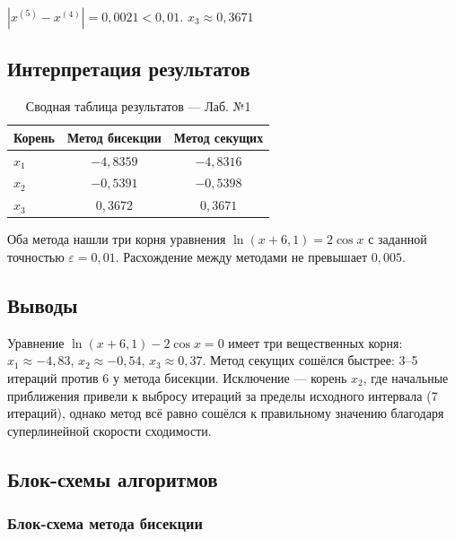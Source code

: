 \documentclass[a4paper,12pt]{article}
\begin{document}
$|x^{(5)} - x^{(4)}| = 0{,}0021 < 0{,}01$. \quad $\boxed{x_3 \approx 0{,}3671}$

\subsection{Интерпретация результатов}

\begin{table}[H]
\centering
\caption{Сводная таблица результатов --- Лаб. №1}
\begin{tabular}{lcc}
\toprule
Корень & Метод бисекции & Метод секущих \\
\midrule
$x_1$ & $-4{,}8359$ & $-4{,}8316$ \\
$x_2$ & $-0{,}5391$ & $-0{,}5398$ \\
$x_3$ & $0{,}3672$  & $0{,}3671$  \\
\bottomrule
\end{tabular}
\end{table}

Оба метода нашли три корня уравнения $\ln(x+6{,}1) = 2\cos x$ с заданной точностью $\varepsilon = 0{,}01$.
Расхождение между методами не превышает $0{,}005$.

\subsection{Выводы}

Уравнение $\ln(x+6{,}1) - 2\cos x = 0$ имеет три вещественных корня: $x_1 \approx -4{,}83$, $x_2 \approx -0{,}54$, $x_3 \approx 0{,}37$.
Метод секущих сошёлся быстрее: 3--5 итераций против 6 у метода бисекции.
Исключение --- корень $x_2$, где начальные приближения привели к выбросу итераций за пределы исходного интервала (7 итераций), однако метод всё равно сошёлся к правильному значению благодаря суперлинейной скорости сходимости.

\subsection{Блок-схемы алгоритмов}

\subsubsection*{Блок-схема метода бисекции}
\end{document}
